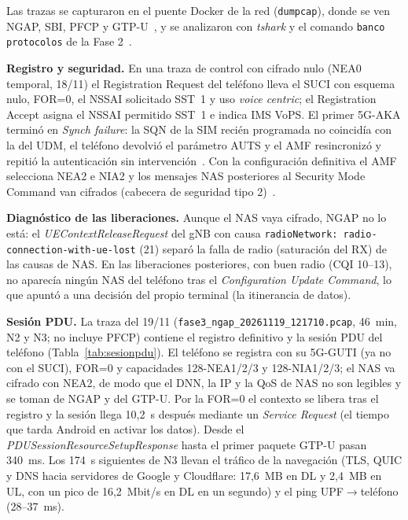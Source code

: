 \documentclass[conference]{IEEEtran}
\begin{document}
Las trazas se capturaron en el puente Docker de la red (\texttt{dumpcap}), donde se ven NGAP, SBI, PFCP y GTP-U~\cite{ts38413,ts29244,ts29281}, y se analizaron con \textit{tshark} y el comando \texttt{banco protocolos} de la Fase 2~\cite{wireshark}.

\textbf{Registro y seguridad.} En una traza de control con cifrado nulo (NEA0 temporal, 18/11) el Registration Request del teléfono lleva el SUCI con esquema nulo, FOR=0, el NSSAI solicitado SST~1 y uso \textit{voice centric}; el Registration Accept asigna el NSSAI permitido SST~1 e indica IMS VoPS. El primer 5G-AKA terminó en \textit{Synch failure}: la SQN de la SIM recién programada no coincidía con la del UDM, el teléfono devolvió el parámetro AUTS y el AMF resincronizó y repitió la autenticación sin intervención~\cite{ts33501}. Con la configuración definitiva el AMF selecciona NEA2 e NIA2 y los mensajes NAS posteriores al Security Mode Command van cifrados (cabecera de seguridad tipo 2)~\cite{ts24501}.

\textbf{Diagnóstico de las liberaciones.} Aunque el NAS vaya cifrado, NGAP no lo está: el \textit{UEContextReleaseRequest} del gNB con causa \texttt{radioNetwork: radio-connection-with-ue-lost} (21) separó la falla de radio (saturación del RX) de las causas de NAS. En las liberaciones posteriores, con buen radio (CQI 10--13), no aparecía ningún NAS del teléfono tras el \textit{Configuration Update Command}, lo que apuntó a una decisión del propio terminal (la itinerancia de datos).

\textbf{Sesión PDU.} La traza del 19/11 (\texttt{fase3\_ngap\_20261119\_121710.pcap}, 46~min, N2 y N3; no incluye PFCP) contiene el registro definitivo y la sesión PDU del teléfono (Tabla~\ref{tab:sesionpdu}). El teléfono se registra con su 5G-GUTI (ya no con el SUCI), FOR=0 y capacidades 128-NEA1/2/3 y 128-NIA1/2/3; el NAS va cifrado con NEA2, de modo que el DNN, la IP y la QoS de NAS no son legibles y se toman de NGAP y del GTP-U. Por la FOR=0 el contexto se libera tras el registro y la sesión llega 10,2~s después mediante un \textit{Service Request} (el tiempo que tarda Android en activar los datos). Desde el \textit{PDUSessionResourceSetupResponse} hasta el primer paquete GTP-U pasan 340~ms. Los 174~s siguientes de N3 llevan el tráfico de la navegación (TLS, QUIC y DNS hacia servidores de Google y Cloudflare: 17,6~MB en DL y 2,4~MB en UL, con un pico de 16,2~Mbit/s en DL en un segundo) y el ping UPF$\rightarrow$teléfono (28--37~ms).
\end{document}
